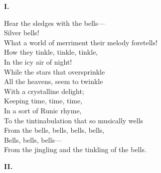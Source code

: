 \documentclass[fontsize=9, a5paper]{scrbook}
\begin{document}
\begin{poem}
\begin{stanza}
\textbf{I.}

        \verseindent Hear the sledges with the bells—\\
                 \verseindent\verseindent\verseindent  Silver bells!\\
What a world of merriment their melody foretells!\\
        \verseindent How they tinkle, tinkle, tinkle,\\
           \verseindent\verseindent In the icy air of night!\\
        \verseindent While the stars that oversprinkle\\
        \verseindent All the heavens, seem to twinkle\\
           \verseindent\verseindent With a crystalline delight;\\
         \verseindent Keeping time, time, time,\\
         \verseindent In a sort of Runic rhyme,\\
To the tintinabulation that so musically wells\\
       \verseindent From the bells, bells, bells, bells,\\
               \verseindent\verseindent\verseindent Bells, bells, bells—\\
 From the jingling and the tinkling of the bells.
\end{stanza}

\pagebreak 
\begin{stanza}
\textbf{II.}


\end{stanza}
\end{poem}
\end{document}
